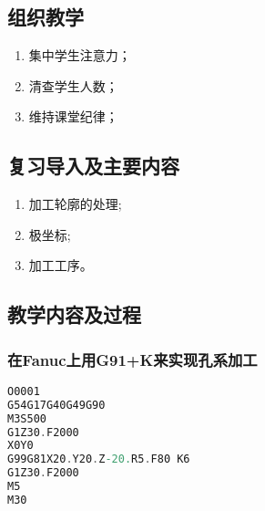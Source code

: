\jxhj{%
	}

\makeshouye %

\subsection{组织教学}
\begin{enumerate}[\hspace{2em}1、]
	\item 集中学生注意力；
	\item 清查学生人数；
	\item 维持课堂纪律；
\end{enumerate}
\subsection{复习导入及主要内容}
\begin{enumerate}[1、]
	\item 加工轮廓的处理;
	\item 极坐标;
	\item 加工工序。
\end{enumerate}


\subsection{教学内容及过程}


\subsubsection{在Fanuc上用G91+K来实现孔系加工}

\begin{lstlisting}[language=C]
O0001
G54G17G40G49G90
M3S500
G1Z30.F2000
X0Y0
G99G81X20.Y20.Z-20.R5.F80 K6
G1Z30.F2000
M5
M30
\end{lstlisting}


